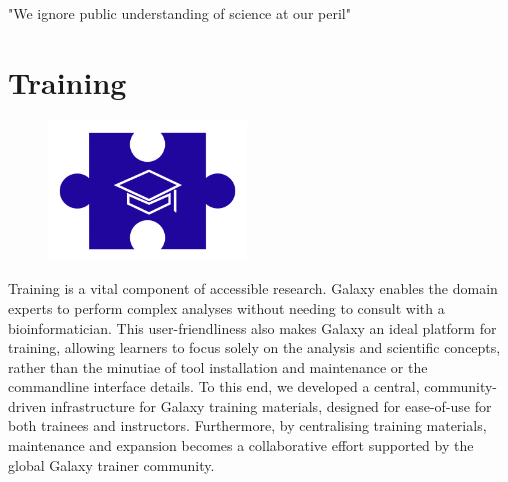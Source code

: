 \begin{savequote}[75mm]
"We ignore public understanding of science at our peril"
\end{savequote}

\chapter{Training}\label{chapter:training}

\begin{figure}[t!]
\includegraphics[height=10em]{frontmatter/images/chapter-header-training.png}
\end{figure}
\setcounter{figure}{-1}
\setcounter{table}{-1}
\setcounter{section}{-1}

Training is a vital component of accessible research. Galaxy enables the domain experts to perform complex analyses without needing to consult with a bioinformatician. This user-friendliness also makes Galaxy an ideal platform for training, allowing learners to focus solely on the analysis and scientific concepts, rather than the minutiae of tool installation and maintenance or the commandline interface details. To this end, we developed a central, community-driven infrastructure for Galaxy training materials, designed for ease-of-use for both trainees and instructors. Furthermore, by centralising training materials, maintenance and expansion becomes a collaborative effort supported by the global Galaxy trainer community.
